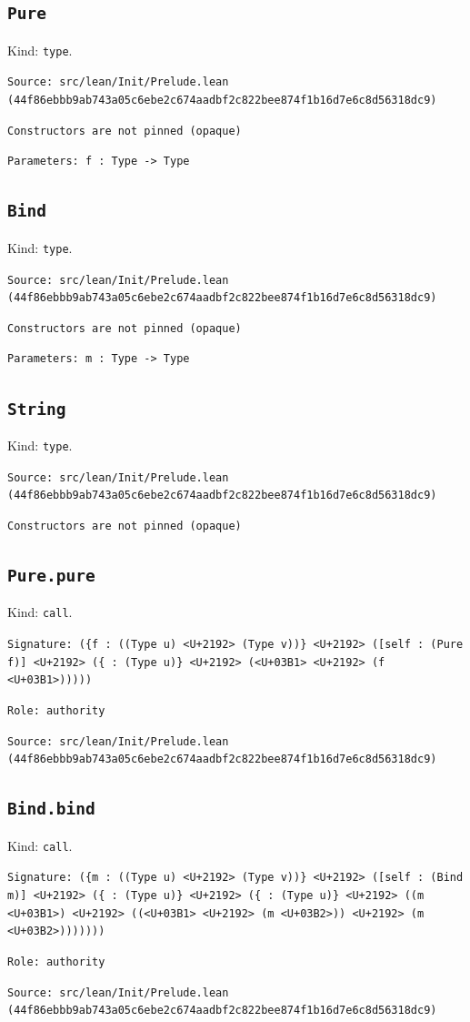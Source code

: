 \documentclass[11pt]{article}
\begin{document}
\subsection*{\texttt{Pure}}
\noindent Kind: \texttt{type}.\par
\noindent \texttt{Source: src/lean/Init/Prelude.lean (44f86ebbb9ab743a05c6ebe2c674aadbf2c822bee874f1b16d7e6c8d56318dc9)}\par
\noindent \texttt{Constructors are not pinned (opaque)}\par
\noindent \texttt{Parameters: f : Type -> Type}\par
\subsection*{\texttt{Bind}}
\noindent Kind: \texttt{type}.\par
\noindent \texttt{Source: src/lean/Init/Prelude.lean (44f86ebbb9ab743a05c6ebe2c674aadbf2c822bee874f1b16d7e6c8d56318dc9)}\par
\noindent \texttt{Constructors are not pinned (opaque)}\par
\noindent \texttt{Parameters: m : Type -> Type}\par
\subsection*{\texttt{String}}
\noindent Kind: \texttt{type}.\par
\noindent \texttt{Source: src/lean/Init/Prelude.lean (44f86ebbb9ab743a05c6ebe2c674aadbf2c822bee874f1b16d7e6c8d56318dc9)}\par
\noindent \texttt{Constructors are not pinned (opaque)}\par
\subsection*{\texttt{Pure.pure}}
\noindent Kind: \texttt{call}.\par
\noindent \texttt{Signature: (\{f : ((Type u) <U+2192> (Type v))\} <U+2192> ([self : (Pure f)] <U+2192> (\{<U+03B1> : (Type u)\} <U+2192> (<U+03B1> <U+2192> (f <U+03B1>)))))}\par
\noindent \texttt{Role: authority}\par
\noindent \texttt{Source: src/lean/Init/Prelude.lean (44f86ebbb9ab743a05c6ebe2c674aadbf2c822bee874f1b16d7e6c8d56318dc9)}\par
\subsection*{\texttt{Bind.bind}}
\noindent Kind: \texttt{call}.\par
\noindent \texttt{Signature: (\{m : ((Type u) <U+2192> (Type v))\} <U+2192> ([self : (Bind m)] <U+2192> (\{<U+03B1> : (Type u)\} <U+2192> (\{<U+03B2> : (Type u)\} <U+2192> ((m <U+03B1>) <U+2192> ((<U+03B1> <U+2192> (m <U+03B2>)) <U+2192> (m <U+03B2>)))))))}\par
\noindent \texttt{Role: authority}\par
\noindent \texttt{Source: src/lean/Init/Prelude.lean (44f86ebbb9ab743a05c6ebe2c674aadbf2c822bee874f1b16d7e6c8d56318dc9)}\par
\end{document}
